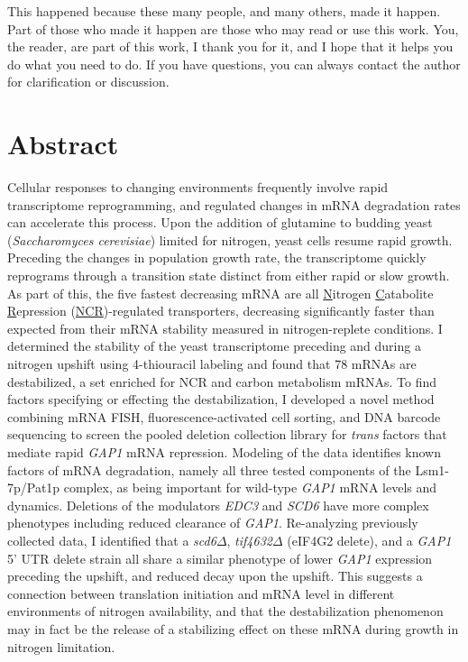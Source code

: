 \documentclass[12pt,letterpaper]{memoir}
\begin{document}
This happened because these many people, and many others, 
made it happen. Part of those who made it happen are those who may
read or use this work. You, the reader, are part of this work,
I thank you for it, 
and I hope that it helps you do what you need to do.
If you have questions, you can always contact the author for 
clarification or discussion. 

\newpage

\section*{Abstract}
\vspace{-0.5em}

Cellular responses to changing environments frequently involve rapid
transcriptome reprogramming, and regulated changes in mRNA 
degradation rates can accelerate this process.
Upon the addition of glutamine to budding yeast 
(\textit{Saccharomyces cerevisiae}) limited for nitrogen,
yeast cells resume rapid growth. 
Preceding the changes in population growth rate,
the transcriptome quickly reprograms through a transition state
distinct from either rapid or slow growth.
As part of this,
the five fastest decreasing mRNA are all 
\underline{N}itrogen \underline{C}atabolite \underline{R}epression 
(\underline{NCR})-regulated transporters, decreasing 
significantly faster than expected from their mRNA 
stability measured in nitrogen-replete conditions.
I determined the stability of the yeast transcriptome 
preceding and during a nitrogen upshift using 
4-thiouracil labeling and found that 78 mRNAs are destabilized,
a set enriched for NCR and carbon metabolism mRNAs.
To find factors specifying or effecting the destabilization, I
developed a novel method combining mRNA FISH, fluorescence-activated
cell sorting, and DNA barcode sequencing to screen the pooled deletion
collection library for \textit{trans} factors that mediate 
rapid \textit{GAP1} mRNA repression. 
%
%
Modeling of the data identifies known factors of mRNA
degradation, namely all three tested components of the
Lsm1-7p/Pat1p complex, as being important for wild-type \textit{GAP1}
mRNA levels and dynamics. Deletions of the modulators \textit{EDC3} and \textit{SCD6}
have more complex phenotypes including reduced clearance of
\textit{GAP1}. Re-analyzing previously collected data,
I identified that a \textit{scd6}$\Delta$, \textit{tif4632}$\Delta$
(eIF4G2 delete), and a \textit{GAP1} 5' UTR delete strain all
share a similar phenotype of lower \textit{GAP1} expression preceding
the upshift, and reduced decay upon the upshift. This suggests a
connection between translation initiation and mRNA level in different
environments of nitrogen availability, and that the destabilization 
phenomenon may in fact be the release of a stabilizing effect on these 
mRNA during growth in nitrogen limitation.
\end{document}
